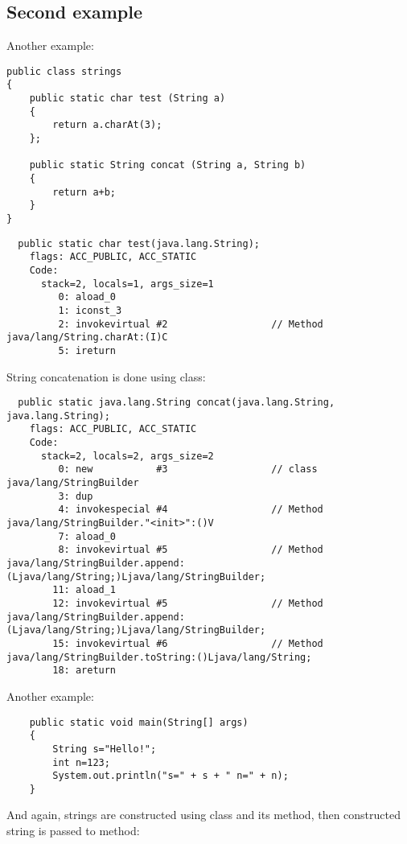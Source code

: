 \subsection{Second example}

Another example:

\begin{lstlisting}
public class strings
{
	public static char test (String a)
	{
		return a.charAt(3);
	};

	public static String concat (String a, String b)
	{
		return a+b;
	}
}
\end{lstlisting}

\begin{lstlisting}
  public static char test(java.lang.String);
    flags: ACC_PUBLIC, ACC_STATIC
    Code:
      stack=2, locals=1, args_size=1
         0: aload_0       
         1: iconst_3      
         2: invokevirtual #2                  // Method java/lang/String.charAt:(I)C
         5: ireturn       
\end{lstlisting}
         
String concatenation is done using  class:

\begin{lstlisting}
  public static java.lang.String concat(java.lang.String, java.lang.String);
    flags: ACC_PUBLIC, ACC_STATIC
    Code:
      stack=2, locals=2, args_size=2
         0: new           #3                  // class java/lang/StringBuilder
         3: dup           
         4: invokespecial #4                  // Method java/lang/StringBuilder."<init>":()V
         7: aload_0       
         8: invokevirtual #5                  // Method java/lang/StringBuilder.append:(Ljava/lang/String;)Ljava/lang/StringBuilder;
        11: aload_1       
        12: invokevirtual #5                  // Method java/lang/StringBuilder.append:(Ljava/lang/String;)Ljava/lang/StringBuilder;
        15: invokevirtual #6                  // Method java/lang/StringBuilder.toString:()Ljava/lang/String;
        18: areturn       
\end{lstlisting}

Another example:

\begin{lstlisting}
	public static void main(String[] args)
	{
		String s="Hello!";
		int n=123;
		System.out.println("s=" + s + " n=" + n);
	}
\end{lstlisting}

And again, strings are constructed using  class and its  method,
then constructed string is passed to  method:

